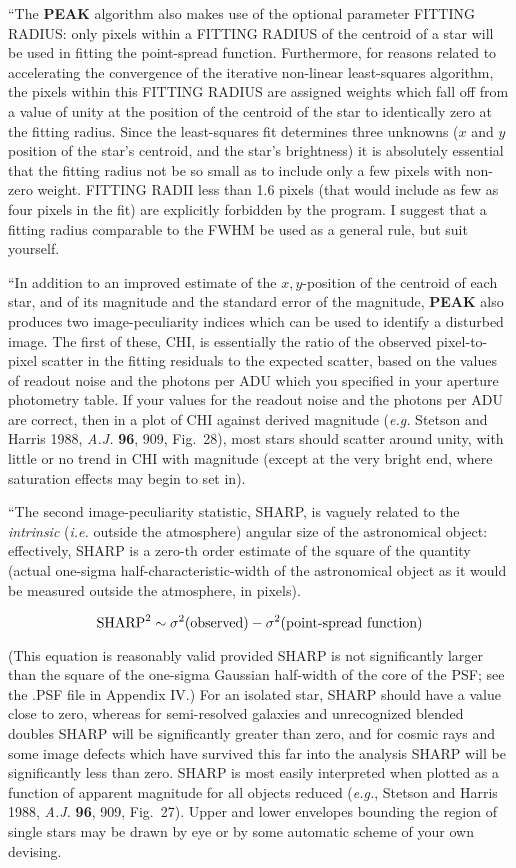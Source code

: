 ``The {\bf PEAK} algorithm also makes use of the optional parameter
FITTING RADIUS:  only pixels within a FITTING RADIUS of the centroid of
a star will be used in fitting the point-spread function.  Furthermore,
for reasons related to accelerating the convergence of the iterative
non-linear least-squares algorithm, the pixels within this FITTING
RADIUS are assigned weights which fall off from a value of unity at the
position of the centroid of the star to identically zero at the fitting
radius.  Since the least-squares fit determines three unknowns ($x$ and
$y$ position of the star's centroid, and the star's brightness) it is
absolutely essential that the fitting radius not be so small as to
include only a few pixels with non-zero weight.  FITTING RADII less
than 1.6 pixels (that would include as few as four pixels in the fit)
are explicitly forbidden by the program.  I suggest that a fitting
radius comparable to the FWHM be used as a general rule, but suit
yourself.

``In addition to an improved estimate of the $x,y$-position of the
centroid of each star, and of its magnitude and the standard error of
the magnitude, {\bf PEAK} also produces two image-peculiarity indices
which can be used to identify a disturbed image.  The first of these,
CHI, is essentially the ratio of the observed pixel-to-pixel scatter in
the fitting residuals to the expected scatter, based on the values of
readout noise and the photons per ADU which you specified in your
aperture photometry table.  If your values for the readout noise and
the photons per ADU are correct, then in a plot of CHI against derived
magnitude ({\it e.g.} Stetson and Harris 1988, {\it A.J.} {\bf 96},
909, Fig.~28), most stars should scatter around unity, with little or
no trend in CHI with magnitude (except at the very bright end, where
saturation effects may begin to set in).

``The second image-peculiarity statistic, SHARP, is vaguely related to
the {\it intrinsic\/} ({\it i.e.\/} outside the atmosphere) angular
size of the astronomical object:  effectively, SHARP is a zero-th order
estimate of the square of the quantity (actual one-sigma
half-characteristic-width of the astronomical object as it would be
measured outside the atmosphere, in pixels).

$$ \hbox{\rm SHARP}^2 \sim
\sigma^2(\hbox{\rm observed}) - \sigma^2(\hbox{\rm point-spread
function})$$

\noindent (This equation is reasonably valid provided SHARP is not
significantly larger than the square of the one-sigma Gaussian
half-width of the core of the PSF; see the .PSF file in Appendix IV.)
For an isolated star, SHARP should have a value close to zero, whereas
for semi-resolved galaxies and unrecognized blended doubles SHARP will
be significantly greater than zero, and for cosmic rays and some image
defects which have survived this far into the analysis SHARP will be
significantly less than zero.  SHARP is most easily interpreted when
plotted as a function of apparent magnitude for all objects reduced
({\it e.g.}, Stetson and Harris 1988, {\it A.J.} {\bf 96}, 909,
Fig.~27). Upper and lower envelopes bounding the region of single stars
may be drawn by eye or by some automatic scheme of your own devising.

